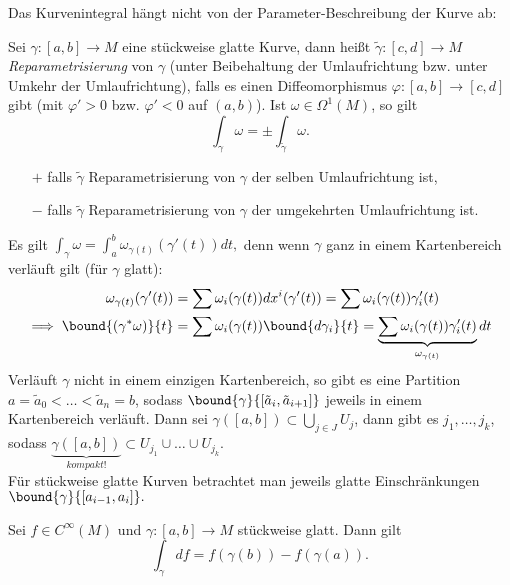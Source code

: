 Das Kurvenintegral hängt nicht von der Parameter-Beschreibung der Kurve ab:

\begin{lem}
	Sei $ \gamma: [a,b] \to M $ eine stückweise glatte Kurve, dann heißt $ \tilde{\gamma}: [c,d] \to M $ \emph{Reparametrisierung} von $\gamma$ (unter Beibehaltung der Umlaufrichtung bzw. unter Umkehr der Umlaufrichtung), falls es einen Diffeomorphismus $\varphi: [a,b] \to [c,d]$ gibt (mit $\varphi' > 0$ bzw. $\varphi' < 0$ auf $(a,b)$). Ist $\omega \in \Omega^1(M)$, so gilt
	\[ \int_\gamma \omega = \pm \int_{\tilde{\gamma}} \omega. \]
	\begin{itemize}
		\item[$+$] falls $\tilde{\gamma}$ Reparametrisierung von $\gamma$ der selben Umlaufrichtung ist,
		\item[$-$] falls $\tilde{\gamma}$ Reparametrisierung von $\gamma$ der umgekehrten Umlaufrichtung ist.
	\end{itemize}
\end{lem}

\begin{rem*}
	Es gilt $ \int_\gamma \omega = \int_a^b \omega_{\gamma(t)} (\gamma'(t))dt, $ denn wenn $\gamma$ ganz in einem Kartenbereich verläuft gilt (für $\gamma$ glatt):
	\begin{align*}
		\omega_{\gamma(t)} (\gamma'(t)) &= \sum \omega_i (\gamma(t)) dx^i (\gamma'(t))
			= \sum \omega_i(\gamma(t)) \gamma_i' (t)\\
		\implies \bound{(\gamma^*\omega)}{t} &= \sum \omega_i (\gamma(t)) \bound{d\gamma_i}{t}
			= \underbrace{\sum \omega_i (\gamma(t)) \gamma_i'(t)}_{\omega_{\gamma (t)}} dt
	\end{align*}
	Verläuft $\gamma$ nicht in einem einzigen Kartenbereich, so gibt es eine Partition $ a=\tilde{a}_0 < \dots < \tilde{a}_n = b $, sodass $ \bound{\gamma}{[\tilde{a}_i,\tilde{a}_{i+1}]} $ jeweils in einem Kartenbereich verläuft. Dann sei $ \gamma([a,b]) \subset \bigcup_{j \in J} U_j $, dann gibt es $ j_1,\dotsc,j_k$, sodass $ \underbrace{\gamma([a,b])}_{kompakt!} \subset U_{j_1} \cup \dots \cup U_{j_k}. $\\
	Für stückweise glatte Kurven betrachtet man jeweils glatte Einschränkungen $ \bound{\gamma}{[a_{i-1},a_i]}. $
\end{rem*}

\begin{thm}\label{3.33}
	Sei $ f \in C^\infty(M) $ und $ \gamma:[a,b] \to M $ stückweise glatt. Dann gilt
	\[ \int_\gamma df = f(\gamma(b)) - f(\gamma(a)). \]
\end{thm}